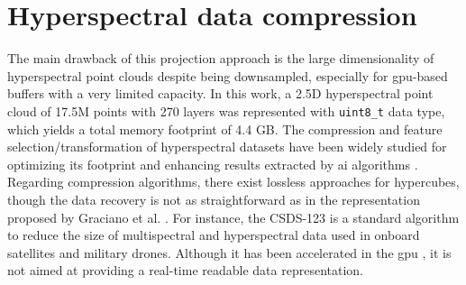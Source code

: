 \section{Hyperspectral data compression}

The main drawback of this projection approach is the large dimensionality of hyperspectral point clouds despite being downsampled, especially for \acrshort{gpu}-based buffers with a very limited capacity. In this work, a 2.5D hyperspectral point cloud of 17.5M points with 270 layers was represented with \verb|uint8_t| data type, which yields a total memory footprint of 4.4 GB. The compression and feature selection/transformation of hyperspectral datasets have been widely studied for optimizing its footprint \cite{barrios_shyloc_2020, barrios_performance_2022} and enhancing results extracted by \acrshort{ai} algorithms \cite{xuan_early_2022}. Regarding compression algorithms, there exist lossless approaches for hypercubes, though the data recovery is not as straightforward as in the representation proposed by Graciano et al. \cite{graciano_quadstack_2021}. For instance, the CSDS-123 \cite{barrios_shyloc_2020, barrios_performance_2022} is a standard algorithm to reduce the size of multispectral and hyperspectral data used in onboard satellites and military drones. Although it has been accelerated in the \acrshort{gpu} \cite{ferraz_hyperspectral_2021}, it is not aimed at providing a real-time readable data representation.

